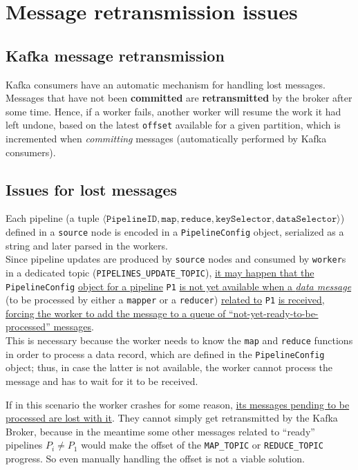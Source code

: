 
\section{Message retransmission issues}
\subsection{Kafka message retransmission}
Kafka consumers have an automatic mechanism for handling lost messages. Messages that have not been \textbf{committed} are \textbf{retransmitted} by the broker after some time. Hence, if a worker fails, another worker will resume the work it had left undone, based on the latest \texttt{offset} available for a given partition, which is incremented when \textit{committing} messages (automatically performed by Kafka consumers).

\subsection{Issues for lost messages}
Each pipeline (a tuple $\langle \texttt{PipelineID}, \texttt{map}, \texttt{reduce}, \texttt{keySelector}, \texttt{dataSelector} \rangle$) defined in a \texttt{source} node is encoded in a \verb|PipelineConfig| object, serialized as a string and later parsed in the workers.\\ 
Since pipeline updates are produced by \texttt{source} nodes and consumed by \texttt{worker}s in a dedicated topic (\verb|PIPELINES_UPDATE_TOPIC|), \ul{it may happen that the} \verb|PipelineConfig| \ul{object for a pipeline} \verb|P1| \ul{is not yet available when a \textit{data message}} (to be processed by either a \texttt{mapper} or a \texttt{reducer}) \ul{related to} \verb|P1| \ul{is received}, \ul{forcing the worker to add the message to a queue of ``not-yet-ready-to-be-processed'' messages}.\\
This is necessary because the worker needs to know the \verb|map| and \verb|reduce| functions in order to process a data record, which are defined in the \verb|PipelineConfig| object;
thus, in case the latter is not available, the worker cannot process the message and has to wait for it to be received.

If in this scenario the worker crashes for some reason, \ul{its messages pending to be processed are lost with it}.
They cannot simply get retransmitted by the Kafka Broker, because in the meantime some other messages related to ``ready'' pipelines $P_i \neq P_1$ would make the offset of the \verb|MAP_TOPIC| or \verb|REDUCE_TOPIC| progress.
So even manually handling the offset is not a viable solution.

